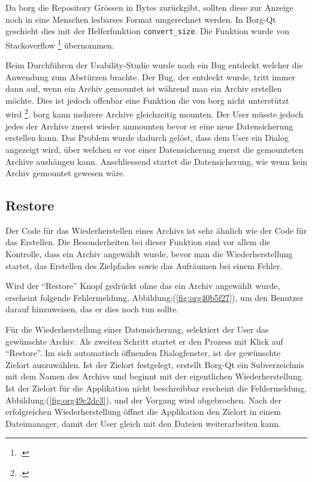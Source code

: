 Da \gls{borg} die Repository Grössen in Bytes zurückgibt, sollten diese zur
Anzeige noch in eine Menschen lesbarses Format umgerechnet werden. In Borg-Qt
geschieht dies mit der Helferfunktion \texttt{convert\_size}. Die Funktion wurde von
Stackoverflow \footcite{sizeformat} übernommen.

Beim Durchführen der Usability-Studie wurde noch ein Bug entdeckt welcher die
Anwendung zum Abstürzen brachte. Der Bug, der entdeckt wurde, tritt immer dann
auf, wenn ein Archiv gemountet ist während man ein Archiv erstellen möchte.
Dies ist jedoch offenbar eine Funktion die von \gls{borg} nicht unterstützt wird
\footcite{borgmountissue}. \gls{borg} kann mehrere Archive gleichzeitig mounten.\newpage
Der User müsste jedoch jedes der Archive zuerst wieder unmounten bevor er eine
neue Datensicherung erstellen kann. Das Problem wurde dadurch gelöst, dass dem
User ein Dialog angezeigt wird, über welchen er vor einer Datensicherung zuerst
die gemounteten Archive aushängen kann. Anschliessend startet die
Datensicherung, wie wenn kein Archiv gemountet gewesen wäre.

\subsection{Restore}
\label{sec:org5c152c9}

Der Code für das Wiederherstellen eines Archivs ist sehr ähnlich wie der Code
für das Erstellen. Die Besonderheiten bei dieser Funktion sind vor allem die
Kontrolle, dass ein Archiv angewählt wurde, bevor man die Wiederherstellung
startet, das Erstellen des Zielpfades sowie das Aufräumen bei einem Fehler.

Wird der "`Restore"' Knopf gedrückt ohne das ein Archiv angewählt wurde, erscheint
folgende Fehlermeldung, Abbildung:(\ref{fig:org40b5f27}), um den Benutzer
darauf hinzuweisen, das er dies noch tun sollte.

Für die Wiederherstellung einer Datensicherung, selektiert der User das
gewünschte Archiv. Als zweiten Schritt startet er den Prozess mit Klick auf
"`Restore"'. Im sich automatisch öffnenden Dialogfenster, ist der gewünschte
Zielort auszuwählen. Ist der Zielort festgelegt, erstellt Borg-Qt ein
Subverzeichnis mit dem Namen des Archivs und beginnt mit der eigentlichen
Wiederherstellung. Ist der Zielort für die Applikation nicht beschreibbar
erscheint die Fehlermeldung, Abbildung:(\ref{fig:org49c2dc3}), und der Vorgang
wird abgebrochen. Nach der erfolgreichen Wiederherstellung öffnet die
Applikation den Zielort in einem Dateimanager, damit der User gleich mit den
Dateien weiterarbeiten kann.

